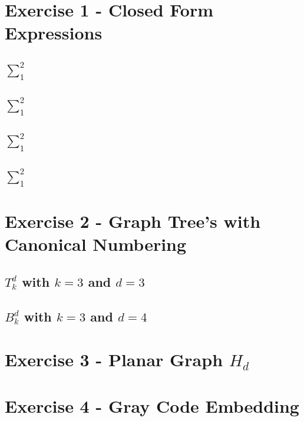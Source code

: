 \section{Exercise 1 - Closed Form Expressions}
\subsection{$\sum_1^2$}
\subsection{$\sum_1^2$}
\subsection{$\sum_1^2$}
\subsection{$\sum_1^2$}

\section{Exercise 2 - Graph Tree's with Canonical Numbering}
\subsection{$T^d_k$ with $k=3$ and $d=3$}
\subsection{$B^d_k$ with $k=3$ and $d=4$}

\section{Exercise 3 - Planar Graph $H_d$}

\section{Exercise 4 - Gray Code Embedding}